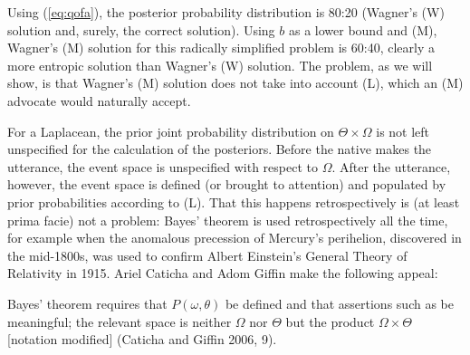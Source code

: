 \documentclass[12pt]{article}
\begin{document}
Using (\ref{eq:qofa}), the posterior probability distribution is 80:20
(Wagner's (W) solution and, surely, the correct solution). Using $b$
as a lower bound and (M), Wagner's (M) solution for this radically
simplified problem is 60:40, clearly a more entropic solution than
Wagner's (W) solution. The problem, as we will show, is that Wagner's
(M) solution does not take into account (L), which an (M) advocate
would naturally accept.

For a Laplacean, the prior joint probability distribution on
$\Theta\times\Omega$ is not left unspecified for the calculation of
the posteriors. Before the native makes the utterance, the event space
is unspecified with respect to $\Omega$. After the utterance, however,
the event space is defined (or brought to attention) and populated by
prior probabilities according to (L). That this happens
retrospectively is (at least prima facie) not a problem: Bayes'
theorem is used retrospectively all the time, for example when the
anomalous precession of Mercury's perihelion, discovered in the
mid-1800s, was used to confirm Albert Einstein's General Theory of
Relativity in 1915. Ariel Caticha and Adom Giffin make the following
appeal:



\begin{quotex}
  Bayes' theorem requires that $P(\omega,\theta)$ be defined and that
  assertions such as  be
  meaningful; the relevant space is neither $\Omega$ nor $\Theta$ but
  the product $\Omega\times\Theta$ [notation modified]
  (Caticha and Giffin 2006, 9).
\end{quotex}
\end{document}
